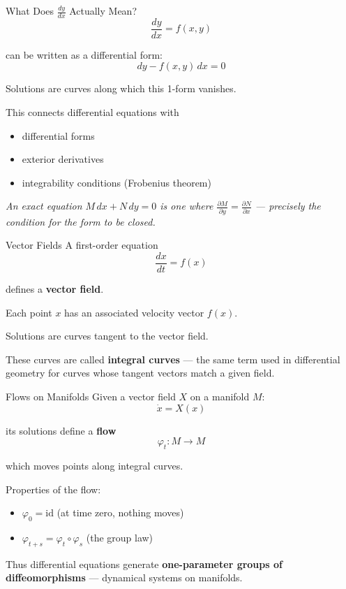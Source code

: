 \begin{frame}{What Does $\frac{dy}{dx}$ Actually Mean?}
\[
\frac{dy}{dx} = f(x,y)
\]

can be written as a differential form:
\[
dy - f(x,y)\,dx = 0
\]

Solutions are curves along which this 1-form vanishes.

This connects differential equations with
\begin{itemize}
\item differential forms
\item exterior derivatives
\item integrability conditions (Frobenius theorem)
\end{itemize}

\vspace{0.3cm}
\textit{An exact equation $M\,dx + N\,dy = 0$ is one where $\frac{\partial M}{\partial y} = \frac{\partial N}{\partial x}$ --- precisely the condition for the form to be closed.}
\end{frame}

\begin{frame}{Vector Fields}
A first-order equation
\[
\frac{dx}{dt} = f(x)
\]

defines a \textbf{vector field}.

Each point $x$ has an associated velocity vector $f(x)$.

Solutions are curves tangent to the vector field.

These curves are called \textbf{integral curves} --- the same term used in differential geometry for curves whose tangent vectors match a given field.
\end{frame}

\begin{frame}{Flows on Manifolds}
Given a vector field $X$ on a manifold $M$:
\[
\dot{x} = X(x)
\]

its solutions define a \textbf{flow}
\[
\varphi_t : M \rightarrow M
\]

which moves points along integral curves.

Properties of the flow:
\begin{itemize}
    \item $\varphi_0 = \text{id}$ (at time zero, nothing moves)
    \item $\varphi_{t+s} = \varphi_t \circ \varphi_s$ (the group law)
\end{itemize}

Thus differential equations generate \textbf{one-parameter groups of diffeomorphisms} --- dynamical systems on manifolds.
\end{frame}

